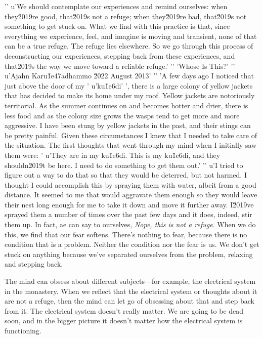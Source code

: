 '\n'
u'We should contemplate our experiences and remind ourselves: when they\u2019re good, that\u2019s not a refuge; when they\u2019re bad, that\u2019s not something to get stuck on. What we find with this practice is that, since everything we experience, feel, and imagine is moving and transient, none of that can be a true refuge. The refuge lies elsewhere. So we go through this process of deconstructing our experiences, stepping back from these experiences, and that\u2019s the way we move toward a reliable refuge.'
'\n'
'Whose Is This?'
'\n'
u'Ajahn Karu\u1e47adhammo \u2022 August 2013'
'\n'
'A few days ago I noticed that just above the door of my '
u'ku\u1e6di'
', there is a large colony of yellow jackets that has decided to make its home under my roof. Yellow jackets are notoriously territorial. As the summer continues on and becomes hotter and drier, there is less food and as the colony size grows the wasps tend to get more and more aggressive. I have been stung by yellow jackets in the past, and their stings can be pretty painful. Given these circumstances I knew that I needed to take care of the situation. The first thoughts that went through my mind when I initially saw them were: '
u'They are in my ku\u1e6di. This is my ku\u1e6di, and they shouldn\u2019t be here. I need to do something to get them out.'
'\n'
u'I tried to figure out a way to do that so that they would be deterred, but not harmed. I thought I could accomplish this by spraying them with water, albeit from a good distance. It seemed to me that would aggravate them enough so they would leave their nest long enough for me to take it down and move it further away. I\u2019ve sprayed them a number of times over the past few days and it does, indeed, stir them up. In fact, ae can say to ourselves, 
\emph{Nope, this is not a refuge}. When we do this, we find that our 
fear softens. There's nothing to fear, because there is no condition 
that is a problem. Neither the condition nor the fear is us. We don't 
get stuck on anything because we've separated ourselves from the 
problem, relaxing and stepping back.

The mind can obsess about different subjects---for example, the 
electrical system in the monastery. When we reflect that the electrical 
system or thoughts about it are not a refuge, then the mind can let go 
of obsessing about that and step back from it. The electrical system 
doesn't really matter. We are going to be dead soon, and in the bigger 
picture it doesn't matter how the electrical system is functioning.

